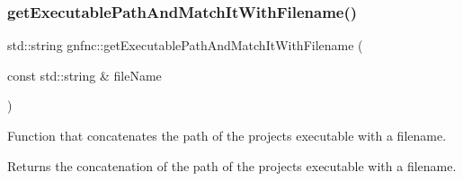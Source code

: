 \subsubsection{\texorpdfstring{get\+Executable\+Path\+And\+Match\+It\+With\+Filename()}{getExecutablePathAndMatchItWithFilename()}}
{\footnotesize\ttfamily std\+::string gnfnc\+::get\+Executable\+Path\+And\+Match\+It\+With\+Filename (\begin{DoxyParamCaption}\item[{const std\+::string \&}]{file\+Name }\end{DoxyParamCaption})}

Function that concatenates the path of the project\textquotesingle{}s executable with a filename. \begin{DoxyReturn}{Returns}
the concatenation of the path of the project\textquotesingle{}s executable with a filename. 
\end{DoxyReturn}
